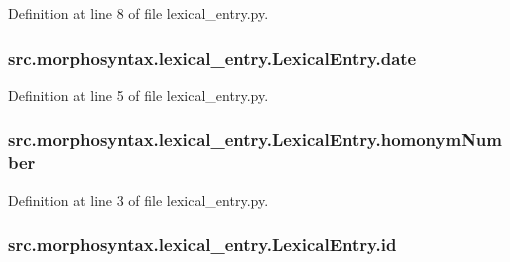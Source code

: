 Definition at line 8 of file lexical\+\_\+entry.\+py.

\hypertarget{classsrc_1_1morphosyntax_1_1lexical__entry_1_1_lexical_entry_ae3d3263b9224d404fbcc19b806de244e}{
\subsubsection[{date}]{\setlength{\rightskip}{0pt plus 5cm}src.\+morphosyntax.\+lexical\+\_\+entry.\+Lexical\+Entry.\+date}}\label{classsrc_1_1morphosyntax_1_1lexical__entry_1_1_lexical_entry_ae3d3263b9224d404fbcc19b806de244e}


Definition at line 5 of file lexical\+\_\+entry.\+py.

\hypertarget{classsrc_1_1morphosyntax_1_1lexical__entry_1_1_lexical_entry_a9ac0a128386a0dc656254cbebc7ed829}{
\subsubsection[{homonym\+Number}]{\setlength{\rightskip}{0pt plus 5cm}src.\+morphosyntax.\+lexical\+\_\+entry.\+Lexical\+Entry.\+homonym\+Number}}\label{classsrc_1_1morphosyntax_1_1lexical__entry_1_1_lexical_entry_a9ac0a128386a0dc656254cbebc7ed829}


Definition at line 3 of file lexical\+\_\+entry.\+py.

\hypertarget{classsrc_1_1morphosyntax_1_1lexical__entry_1_1_lexical_entry_ac019dbd081f9cc11ea0e0acc1dc813eb}{
\subsubsection[{id}]{\setlength{\rightskip}{0pt plus 5cm}src.\+morphosyntax.\+lexical\+\_\+entry.\+Lexical\+Entry.\+id}}\label{classsrc_1_1morphosyntax_1_1lexical__entry_1_1_lexical_entry_ac019dbd081f9cc11ea0e0acc1dc813eb}


